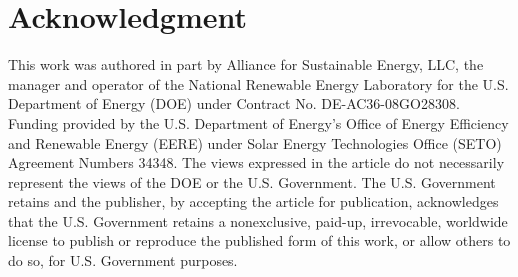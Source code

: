 \documentclass[conference]{IEEEtran}
\begin{document}
\section*{Acknowledgment}

This work was authored in part by Alliance for Sustainable Energy, LLC, the manager and operator of the National Renewable Energy Laboratory for the U.S. Department of Energy (DOE) under Contract No. DE-AC36-08GO28308. Funding provided by the U.S. Department of Energy’s Office of Energy Efficiency and Renewable Energy (EERE) under Solar Energy Technologies Office (SETO) Agreement Numbers 34348. The views expressed in the article do not necessarily represent the views of the DOE or the U.S. Government. The U.S. Government retains and the publisher, by accepting the article for publication, acknowledges that the U.S. Government retains a nonexclusive, paid-up, irrevocable, worldwide license to publish or reproduce the published form of this work, or allow others to do so, for U.S. Government purposes.



\end{document}
